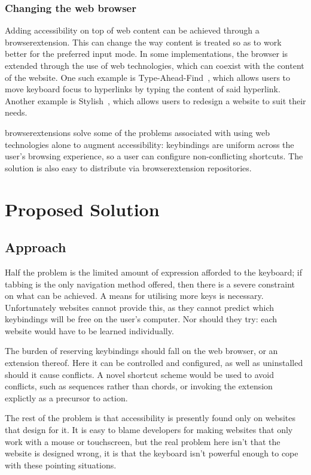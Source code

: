 \documentclass[a4paper, 11pt]{article}
\begin{document}
\subsubsection{Changing the web browser}
\label{changingwebbrowser}
Adding accessibility on top of web content can be achieved through a \gls{browserextension}. This can change the way content is treated so as to work better for the preferred input mode. In some implementations, the browser is extended through the use of web technologies, which can coexist with the content of the website.
One such example is Type-Ahead-Find~\cite{typeaheadfind}, which allows users to move keyboard focus to hyperlinks by typing the content of said hyperlink. Another example is Stylish~\cite{stylish}, which allows users to redesign a website to suit their needs.

\Glspl{browserextension} solve some of the problems associated with using web technologies alone to augment accessibility: \glspl{keybinding} are uniform across the user's browsing experience, so a user can configure non-conflicting shortcuts. The solution is also easy to distribute via \gls{browserextension} repositories.
\section{Proposed Solution}
\subsection{Approach}
Half the problem is the limited amount of expression afforded to the keyboard; if tabbing is the only navigation method offered, then there is a severe constraint on what can be achieved. A means for utilising more keys is necessary. Unfortunately websites cannot provide this, as they cannot predict which \glspl{keybinding} will be free on the user's computer. Nor should they try: each website would have to be learned individually.

The burden of reserving \glspl{keybinding} should fall on the web browser, or an extension thereof. Here it can be controlled and configured, as well as uninstalled should it cause conflicts. A novel shortcut scheme would be used to avoid conflicts, such as sequences rather than chords, or invoking the extension explictly as a precursor to action.

The rest of the problem is that accessibility is presently found only on websites that design for it. It is easy to blame developers for making websites that only work with a mouse or touchscreen, but the real problem here isn't that the website is designed wrong, it is that the keyboard isn't powerful enough to cope with these pointing situations.
\end{document}
